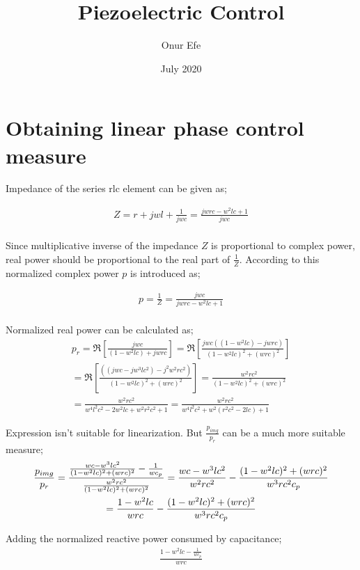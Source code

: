 \documentclass{article}
\title{Piezoelectric Control}
\author{Onur Efe}
\date{July 2020}
\begin{document}
\maketitle

\section{Obtaining linear phase control measure}
Impedance of the series rlc element can be given as;

\begin{multline}
    Z = r + jwl + \frac{1}{jwc}
    = \frac{jwrc - w^2lc + 1}{jwc} \\
\end{multline}

Since multiplicative inverse of the impedance $Z$ is proportional to complex power, real power should be proportional to the real part of $\frac{1}{Z}$. According to this normalized complex power $p$ is introduced as;

\begin{multline}
    p = \frac{1}{Z} = \frac{jwc}{jwrc - w^2lc + 1} \\
\end{multline}

Normalized real power can be calculated as;
\begin{multline}
    p_{r} = \Re{\left[\frac{jwc}{(1-w^2lc) + jwrc} \right]}
    = \Re{\left[\frac{jwc((1-w^2lc) - jwrc)}{(1-w^2lc)^2 + (wrc)^2} \right]} \\
    = \Re{\left[\frac{((jwc-jw^3lc^2) - j^2w^2rc^2)}{(1-w^2lc)^2 + (wrc)^2} \right]}
    = \frac{w^2rc^2}{(1-w^2lc)^2 + (wrc)^2} \\
    = \frac{w^2rc^2}{w^4l^2c^2 - 2w^2lc + w^2r^2c^2 + 1} = \frac{w^2rc^2}{w^4l^2c^2 + w^2(r^2c^2 - 2lc) + 1}
\end{multline}

Expression isn't suitable for linearization. But $\frac{p_{img}}{p_r}$ can be a much more suitable measure;
\begin{multline}{\label{temp:1}}
    \frac{p_{img}}{p_r} 
    = \frac{\frac{wc-w^3lc^2}{(1-w^2lc)^2 + (wrc)^2} - \frac{1}{wc_p}}{\frac{w^2rc^2}{(1-w^2lc)^2 + (wrc)^2}}
    = \frac{wc-w^3lc^2}{w^2rc^2} - \frac{{(1-w^2lc)^2 + (wrc)^2}}{w^3 rc^2 c_p} \\
    = \frac{1-w^2lc}{wrc} - \frac{{(1-w^2lc)^2 + (wrc)^2}}{w^3 rc^2 c_p}
\end{multline}

Adding the normalized reactive power consumed by capacitance;
\begin{multline}
    \frac{1-w^2lc - \frac{1}{wc_p}}{wrc} 
\end{multline}
\end{document}
